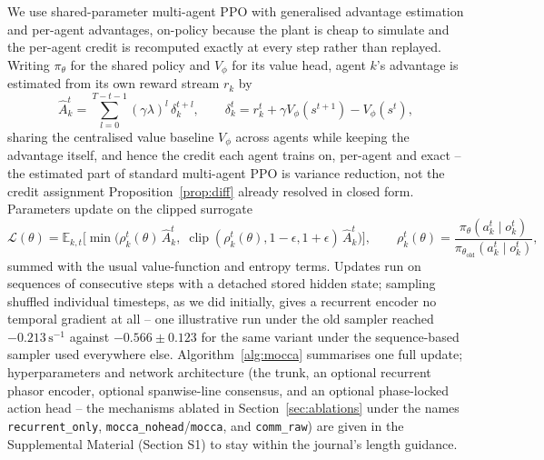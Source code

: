 \documentclass[journal]{new-aiaa}
\begin{document}
We use shared-parameter multi-agent PPO
\cite{schulman2017ppo,yu2022mappo} with generalised advantage estimation
\cite{schulman2016gae} and per-agent advantages, on-policy because the
plant is cheap to simulate and the per-agent credit is recomputed exactly
at every step rather than replayed. Writing $\pi_\theta$ for the shared
policy and $V_\phi$ for its value head, agent $k$'s advantage is estimated
from its own reward stream $r_k$ by
\begin{equation}
\hat A_k^t = \sum_{l=0}^{T-t-1} (\gamma\lambda)^l\, \delta_k^{t+l},
\qquad
\delta_k^t = r_k^t + \gamma V_\phi(s^{t+1}) - V_\phi(s^t),
\label{eq:gae}
\end{equation}
sharing the centralised value baseline $V_\phi$ across agents while keeping
the advantage itself, and hence the credit each agent trains on, per-agent
and exact -- the estimated part of standard multi-agent PPO is variance
reduction, not the credit assignment Proposition~\ref{prop:diff} already
resolved in closed form. Parameters update on the clipped surrogate
\begin{equation}
\mathcal{L}(\theta) = \mathbb{E}_{k,t}\Big[
\min\big(\rho_k^t(\theta)\, \hat A_k^t,\;
\operatorname{clip}(\rho_k^t(\theta), 1{-}\epsilon, 1{+}\epsilon)\, \hat A_k^t\big)
\Big],
\qquad
\rho_k^t(\theta) = \frac{\pi_\theta(a_k^t \mid o_k^t)}{\pi_{\theta_{\mathrm{old}}}(a_k^t \mid o_k^t)},
\label{eq:ppo}
\end{equation}
summed with the usual value-function and entropy terms. Updates run on
sequences of consecutive steps with a detached stored hidden state; sampling
shuffled individual timesteps, as we did initially, gives a recurrent
encoder no temporal gradient at all \cite{hausknecht2015drqn} -- one
illustrative run under the old sampler reached $-0.213\,\mathrm{s}^{-1}$
against $-0.566\pm0.123$ for the same variant under the sequence-based
sampler used everywhere else. Algorithm~\ref{alg:mocca} summarises one
full update; hyperparameters and network architecture (the trunk, an
optional recurrent phasor encoder, optional spanwise-line consensus, and
an optional phase-locked action head -- the mechanisms ablated in
Section~\ref{sec:ablations} under the names \texttt{recurrent\_only},
\texttt{mocca\_nohead}/\texttt{mocca}, and \texttt{comm\_raw}) are given in
the Supplemental Material (Section S1) to stay within the journal's
length guidance.
\end{document}
